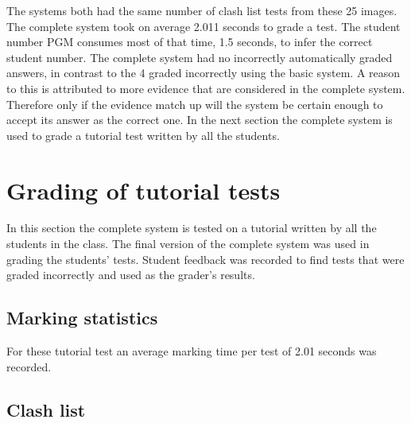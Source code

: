 The systems both had the same number of clash list tests from these 25 images. The complete system took on average 2.011 seconds to grade a test. The student number PGM consumes most of that time, 1.5 seconds, to infer the correct student number. The complete system had no incorrectly automatically graded answers, in contrast to the 4 graded incorrectly using the basic system. A reason to this is attributed to more evidence that are considered in the complete system. Therefore only if the evidence match up will the system be certain enough to accept its answer as the correct one. In the next section the complete system is used to grade a tutorial test written by all the students. 

\section{Grading of tutorial tests}
In this section the complete system is tested on a tutorial written by all the students in the class. The final version of the complete system was used in grading the students' tests. Student feedback was recorded to find tests that were graded incorrectly and used as the grader's results. 

\subsection{Marking statistics}

For these tutorial test an average marking time per test of 2.01 seconds was recorded.

\subsection{Clash list}

